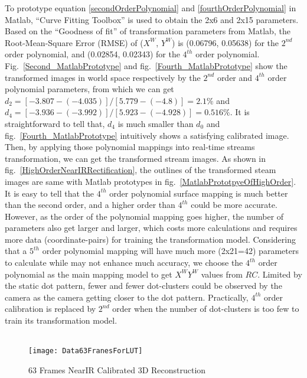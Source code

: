 %
\noindent
To prototype equation \ref{secondOrderPolynomial} and \ref{fourthOrderPolynomial} in Matlab, \enquote{Curve Fitting Toolbox} is used to obtain the 2x6 and 2x15 parameters. Based on the \enquote{Goodness of fit} of transformation parameters from Matlab, the Root-Mean-Square Error (RMSE) of (\(X^W\), \(Y^W\)) is (0.06796, 0.05638) for the \(2^{nd}\) order polynomial, and (0.02854, 0.02343) for the \(4^{th}\) order polynomial. Fig.~\ref{Second_MatlabPrototype} and fig.~\ref{Fourth_MatlabPrototype} show the transformed images in world space respectively by the \(2^{nd}\) order and \(4^{th}\) order polynomial parameters, from which we can get \(d_2 = [-3.807 - (-4.035)] / [5.779 - (-4.8)] = 2.1\%\) and \(d_4 = [-3.936 - (-3.992)] / [5.923 - (-4.928)] = 0.516\%\). It is straightforward to tell that, \(d_4\) is much smaller than \(d_0\) and fig.~\ref{Fourth_MatlabPrototype} intuitively shows a satisfying calibrated image.
\\\indent
Then, by applying those polynomial mappings into real-time streams transformation, we can get the transformed stream images. As shown in fig.~\ref{HighOrderNearIRRectification}, the outlines of the transformed steam images are same with Matlab prototypes in fig.~\ref{MatlabPrototpyeOfHighOrder}. It is easy to tell that the \(4^{th}\) order polynomial surface mapping is much better than the second order, and a higher order than \(4^{th}\) could be more accurate. However, as the order of the polynomial mapping goes higher, the number of parameters also get larger and larger, which costs more calculations and requires more data (coordinate-pairs) for training the transformation model. Considering that a \(5^{th}\) order polynomial mapping will have much more (2x21=42) parameters to calculate while may not enhance much accuracy, we choose the \(4^{th}\) order polynomial as the main mapping model to get \(X^WY^W\) values from \(RC\). Limited by the static dot pattern, fewer and fewer dot-clusters could be observed by the camera as the camera getting closer to the dot pattern. Practically, \(4^{th}\) order calibration is replaced by \(2^{nd}\) order when the number of dot-clusters is too few to train its transformation model.
\\\\\indent
%
\begin{figure}[t]
\centering
\texttt{[image: Data63FranesForLUT]}
\caption{63 Frames NearIR Calibrated 3D Reconstruction}
\label{Data63FranesForLUT}
\end{figure}%
